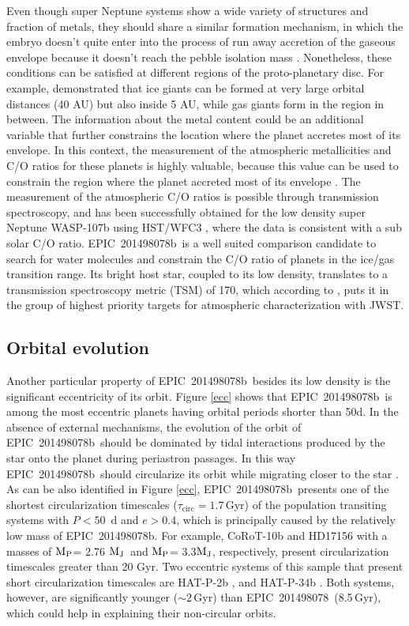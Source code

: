 \documentclass[useAMS,usenatbib]{mnras}
\newcommand{\mjup}{\ensuremath{{\rm M_{J}}}}
\newcommand{\mpl}{\ensuremath{{\rm M_P}}}
\newcommand{\plname}{EPIC~201498078b}
\newcommand{\stname}{EPIC~201498078}
\newcommand{\taucirc}{\ensuremath{\tau_\mathrm{circ}}}
\begin{document}
Even though super Neptune systems show a wide variety of structures and fraction of metals, they should share a similar formation mechanism, in which the embryo doesn't quite enter into the process of run away accretion of the gaseous envelope because it doesn't reach the pebble isolation mass \citep[e.g.][]{ida}.
Nonetheless, these conditions can be satisfied at different regions of the proto-planetary disc. For example, \citet{bitsch} demonstrated that ice giants can be formed at very large orbital distances (40 AU) but also inside 5 AU, while gas giants form in the region in between. The information about the metal content could be an additional variable that further constrains the location where the planet accretes most of its envelope. In this context, the measurement of the atmospheric metallicities and C/O ratios for these planets is highly valuable, because this value can
be used to constrain the region where the planet accreted most of 
its envelope \citep{mordasini:2016, Espinoza:2017}. The measurement of the atmospheric  C/O ratios is possible through transmission spectroscopy, and has been successfully obtained for the low density super Neptune WASP-107b using HST/WFC3 \citep{kreidberg:2018}, where the data is consistent with
a sub solar C/O ratio. \plname\ is a well suited comparison
candidate to search for water molecules and constrain the C/O
ratio of planets in the ice/gas transition range. Its bright
host star, coupled to its low density, translates to a
transmission spectroscopy metric (TSM) of 170, which according
to \citep{tsm}, puts it in the group of highest priority targets
for atmospheric characterization with JWST.

\subsection{Orbital evolution}
Another particular property of \plname\ besides its low density
is  the significant eccentricity of its orbit. Figure \ref{ecc}
shows that \plname\ is among the most eccentric planets having
orbital periods shorter than 50d.
In the absence of external mechanisms, the evolution of the orbit
of \plname\ should be dominated by tidal interactions produced by
the star onto the planet during periastron passages.
In this way \plname\ should circularize its orbit while migrating
closer to the star \citep{jackson:2008}.
As can be also identified in Figure \ref{ecc}, \plname\ presents
one of the shortest circularization timescales ($\taucirc=1.7$\,Gyr)
of the population transiting systems with $P<50$~d and $e>0.4$, which
is principally caused by the relatively low mass of \plname.
For example, CoRoT-10b \citep{corot-10b} and HD17156 \citep{hd17156}
with a masses of \mpl = 2.76 \mjup\ and \mpl = 3.3\mjup, respectively, present circularization timescales greater than 20 Gyr.
Two eccentric systems of this sample that present short
circularization timescales are HAT-P-2b \citep[\mpl = 8.87\mjup,  $\taucirc=0.7$\,Gyr,][]{hat-p-2b}, and HAT-P-34b \citep[$\mpl = 3.33\,\mjup$,  $\taucirc=0.3$\,Gyr,][]{hat-p-34b}.
Both systems, however, are significantly younger ($\sim 2$\,Gyr) than \stname\ (8.5\,Gyr), which could help in explaining their non-circular orbits. 
\end{document}
